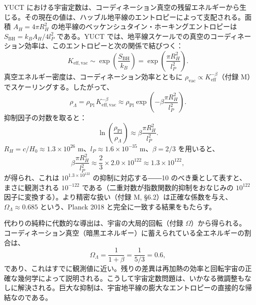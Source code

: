 \documentclass[11pt,a4paper]{article}
\theoremstyle{remark}
\begin{document}
	YUCT における宇宙定数は、コーディネーション真空の残留エネルギーから生じる。その現在の値は、ハッブル地平線のエントロピーによって支配される。面積 \(A_H = 4\pi R_H^2\) の地平線のベッケンシュタイン・ホーキングエントロピーは \(S_{\mathrm{BH}} = k_B A_H / 4l_P^2\) である。YUCT では、地平線スケールでの真空のコーディネーション効率は、このエントロピーと次の関係で結びつく：
	\begin{equation}
		K_{\mathrm{eff, vac}} \sim \exp\left( \frac{S_{\mathrm{BH}}}{k_B} \right) = \exp\left( \frac{\pi R_H^2}{l_P^2} \right).
	\end{equation}
	真空エネルギー密度は、コーディネーション効率とともに \(\rho_{\mathrm{vac}} \propto K_{\mathrm{eff}}^{-\beta}\)（付録 M）でスケーリングする。したがって、
	\begin{equation}
		\rho_\Lambda = \rho_{\mathrm{Pl}} \, K_{\mathrm{eff, vac}}^{-\beta} \approx \rho_{\mathrm{Pl}} \exp\left( -\beta \frac{\pi R_H^2}{l_P^2} \right).
		\label{eq:lambda-suppression}
	\end{equation}
	抑制因子の対数を取ると：
	\begin{equation}
		\ln\left( \frac{\rho_{\mathrm{Pl}}}{\rho_\Lambda} \right) \approx \beta \frac{\pi R_H^2}{l_P^2}.
	\end{equation}
	\(R_H = c / H_0 \approx 1.3 \times 10^{26}\) m、\(l_P \approx 1.6 \times 10^{-35}\) m、\(\beta = 2/3\) を用いると、
	\begin{equation}
		\beta \frac{\pi R_H^2}{l_P^2} \approx \frac{2}{3} \times 2.0 \times 10^{122} \approx 1.3 \times 10^{122},
	\end{equation}
	が得られ、これは \(10^{1.3 \times 10^{122}}\) の抑制に対応する――10 のべき乗として表すと、まさに観測される \(10^{-122}\) である（二重対数が指数関数的抑制をおなじみの \(10^{122}\) 因子に変換する）。より精密な扱い（付録 M, §6.2）は正確な係数を与え、\(\Omega_\Lambda \approx 0.685\) という、Planck 2018 と完全に一致する結果をもたらす。
	
	代わりの純粋に代数的な導出は、宇宙の大局的回転（付録 $\Omega$）から得られる。コーディネーション真空（暗黒エネルギー）に蓄えられている全エネルギーの割合は、
	\begin{equation}
		\Omega_\Lambda = \frac{1}{1+\beta} = \frac{1}{5/3} = 0.6,
	\end{equation}
	であり、これはすでに観測値に近い。残りの差異は再加熱の効率と回転宇宙の正確な幾何学によって説明される。こうして宇宙定数問題は、いかなる微調整もなしに解決される。巨大な抑制は、宇宙地平線の膨大なエントロピーの直接的な帰結なのである。
	
\end{document}
